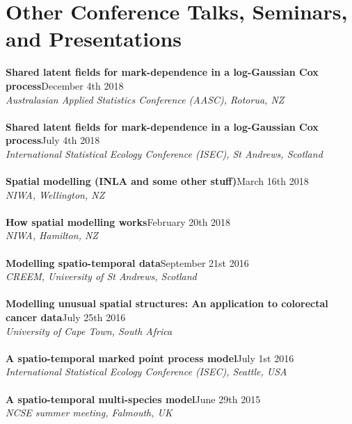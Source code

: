 \documentclass[10pt,letter]{article}
\begin{document}
\section*{Other Conference Talks, Seminars, and Presentations}
\vspace{1mm}
{\textbf{Shared latent fields for mark-dependence in a log-Gaussian Cox process}}\hfill December 4th 2018\\
 {\sl Australasian Applied Statistics Conference (AASC), Rotorua, NZ}\\
\hdashrule[0.5ex]{4cm}{1pt}{1pt}\\
{\textbf{Shared latent fields for mark-dependence in a log-Gaussian Cox process}}\hfill July 4th 2018\\
 {\sl International Statistical Ecology Conference (ISEC), St Andrews, Scotland}\\
\hdashrule[0.5ex]{4cm}{1pt}{1pt}\\
{\textbf{Spatial modelling (INLA and some other stuff)}}\hfill March 16th 2018\\
 {\sl NIWA, Wellington, NZ}\\
\hdashrule[0.5ex]{4cm}{1pt}{1pt}\\
{\textbf{How spatial modelling works}}\hfill February 20th 2018\\
 {\sl NIWA, Hamilton, NZ}\\
\hdashrule[0.5ex]{4cm}{1pt}{1pt}\\
{\textbf{Modelling spatio-temporal data}}\hfill September 21st 2016\\
 {\sl CREEM, University of St Andrews, Scotland}\\
\hdashrule[0.5ex]{4cm}{1pt}{1pt}\\
{\textbf{Modelling unusual spatial structures: An application to colorectal cancer data}}\hfill July 25th 2016\\
 {\sl University of Cape Town, South Africa}\\
\hdashrule[0.5ex]{4cm}{1pt}{1pt}\\
{\textbf{A spatio-temporal marked point process model}}\hfill July 1st 2016\\
 {\sl International Statistical Ecology Conference (ISEC), Seattle, USA}\\
 \hdashrule[0.5ex]{4cm}{1pt}{1pt}\\
 {\textbf{A spatio-temporal multi-species model}}\hfill June 29th 2015\\
 {\sl NCSE summer meeting, Falmouth, UK}\\
 \hdashrule[0.5ex]{4cm}{1pt}{1pt}\\
\end{document}
